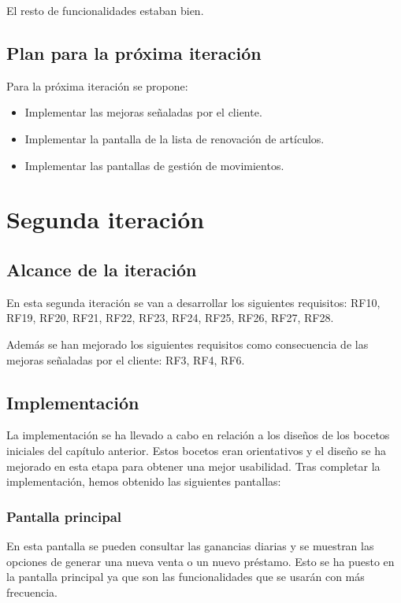 El resto de funcionalidades estaban bien.  


\subsection{Plan para la próxima iteración}

Para la próxima iteración se propone:

\begin{itemize}
	\item Implementar las mejoras señaladas por el cliente.
	\item Implementar la pantalla de la lista de renovación de artículos.
	\item Implementar las pantallas de gestión de movimientos.
\end{itemize}

\newpage

\section{Segunda iteración}

\subsection{Alcance de la iteración}

En esta segunda iteración se van a desarrollar los siguientes requisitos: RF10, RF19, RF20, RF21, RF22, RF23, RF24, RF25, RF26, RF27, RF28. 

Además se han mejorado los siguientes requisitos como consecuencia de las mejoras señaladas por el cliente: RF3, RF4, RF6.

\subsection{Implementación}

La implementación se ha llevado a cabo en relación a los diseños de los bocetos iniciales del capítulo anterior. Estos bocetos eran orientativos y el diseño se ha mejorado en esta etapa para obtener una mejor usabilidad. Tras completar la implementación, hemos obtenido las siguientes pantallas: 

\subsubsection{Pantalla principal}

En esta pantalla se pueden consultar las ganancias diarias y se muestran las opciones de generar una nueva venta o un nuevo préstamo. Esto se ha puesto en la pantalla principal ya que son las funcionalidades que se usarán con más frecuencia. 

